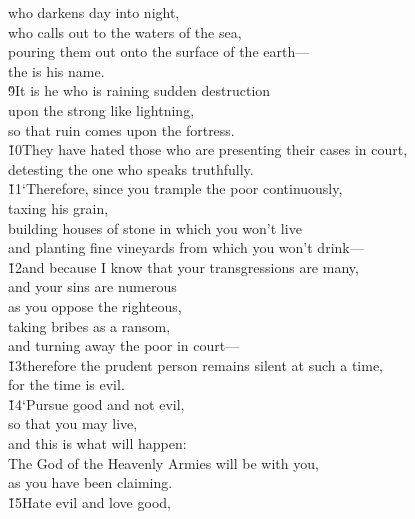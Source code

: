 \begin{poetry}
\poemll    who darkens day into night, \\
\poemll    who calls out to the waters of the sea, \\
\poemlll       pouring them out onto the surface of the earth--- \\
\poemll    the  is his name. \\
\poeml \v{9}It is he who is raining sudden destruction \\
\poemll    upon the strong like lightning, \\
\poemlll       so that ruin comes upon the fortress. \\
\poeml \v{10}They have hated those who are presenting their cases in court, \\
\poemll    detesting the one who speaks truthfully. \\
\poeml \v{11}`Therefore, since you trample the poor continuously, \\
\poemll    taxing his grain, \\
\poemll    building houses of stone in which you won't live \\
\poemll    and planting fine vineyards from which you won't drink--- \\
\poeml \v{12}and because I know that your transgressions are many, \\
\poemll    and your sins are numerous \\
\poeml as you oppose the righteous, \\
\poemll    taking bribes as a ransom, \\
\poemlll       and turning away the poor in court--- \\
\poeml \v{13}therefore the prudent person remains silent at such a time, \\
\poemll    for the time is evil. \\
\poeml \v{14}`Pursue good and not evil, \\
\poemll    so that you may live, \\
\poeml and this is what will happen: \\
\poemll    The  God of the Heavenly Armies will be with you, \\
\poemlll       as you have been claiming. \\
\poeml \v{15}Hate evil and love good, \\

\end{poetry}
